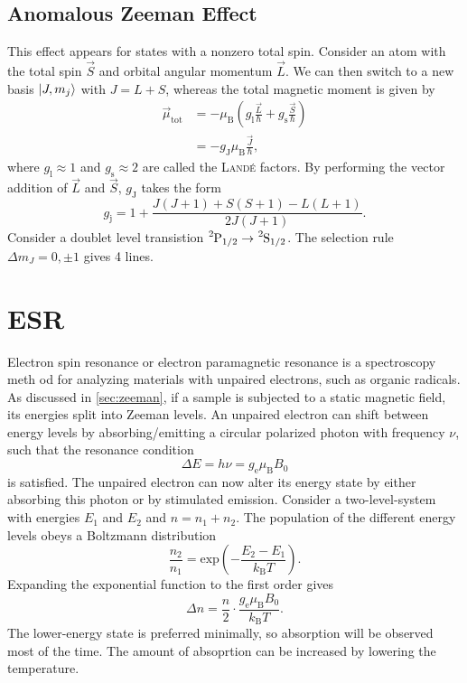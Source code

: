 \subsection{Anomalous Zeeman Effect}
This effect appears for states with a nonzero total spin.
Consider an atom with the total spin $\vec{S}$ and orbital angular momentum $\vec{L}$.
We can then switch to a new basis $\left|J, m_j\right\rangle$ with $J=L+S$, whereas the total magnetic moment is given by
\begin{align*}
	\vec{\mu}_\text{tot} &= -\mu_\text{B}\left(g_\text{l}\frac{\vec{L}}{\hbar} + g_\text{s}\frac{\vec{S}}{\hbar}\right) \\
	&= -g_\text{J}\mu_\text{B}\frac{\vec{J}}{\hbar},
\end{align*}
where $g_\text{l}\approx 1$ and $g_\text{s}\approx 2$ are called the \textsc{Landé} factors.
By performing the vector addition of $\vec{L}$ and $\vec{S}$, $g_\text{J}$ takes the form
\begin{equation*}
	g_\text{j} = 1+\frac{J(J+1)+S(S+1)-L(L+1)}{2J(J+1)}.
\end{equation*}
Consider a doublet level transistion $\ce{^{2}P}_{1/2}\rightarrow \ce{^{2}S}_{1/2}$.
The selection rule $\Delta m_J =0, \pm 1$ gives 4 lines.

\section{ESR}
Electron spin resonance or electron paramagnetic resonance is a spectroscopy meth%
od for analyzing materials with unpaired electrons, such as organic radicals.
As discussed in \autoref{sec:zeeman}, if a sample is subjected to a static magnetic field, its energies split into Zeeman levels.
An unpaired electron can shift between energy levels by absorbing/emitting a circular polarized photon with frequency $\nu$, such that the resonance condition
\begin{equation*}
	\Delta E = h\nu = g_\text{e}\mu_\text{B}B_0
\end{equation*}
is satisfied. %
The unpaired electron can now alter its energy state by either absorbing this photon or by stimulated emission.
Consider a two-level-system with energies $E_1$ and $E_2$ and $n=n_1+n_2$.
The population of the different energy levels obeys a Boltzmann distribution
\begin{equation*}
	\frac{n_2}{n_1}=\text{exp}\left(-\frac{E_2-E_1}{k_\text{B}T}\right).
\end{equation*}
Expanding the exponential function to the first order gives
\begin{equation*}
	\Delta n = \frac{n}{2}\cdot\frac{g_\text{e}\mu_\text{B}B_0}{k_\text{B}T}.
\end{equation*}
The lower-energy state is preferred minimally, so absorption will be observed most of the time.
The amount of absoprtion can be increased by lowering the temperature.

